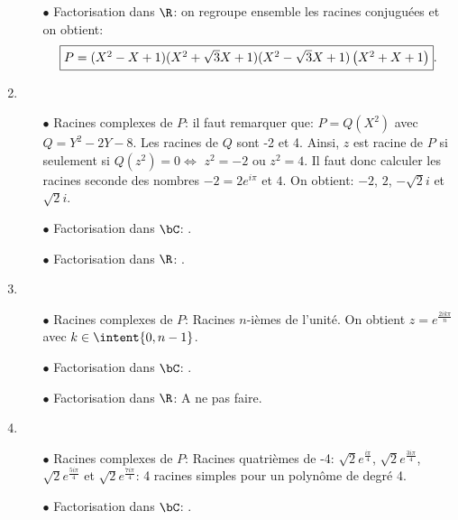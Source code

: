 \documentclass[a4paper, 11pt,reqno]{article}
\begin{document}
\begin{correction}
\begin{enumerate}
\begin{itemize}
			      \item[$\bullet$] Factorisation dans $\R$: on regroupe ensemble les racines conjugu\'ees et on obtient:
			            $$\fbox{$P=(X^2-X+1)(X^2+\sqrt{3}X+1)(X^2-\sqrt{3}X+1)\left(X^2+X+1\right)$}.$$
		      \end{itemize}
		\item
		      \begin{itemize}
			      \item[$\bullet$] Racines complexes de $P$:  il faut remarquer que: $P=Q(X^2)$ avec $Q=Y^2-2Y-8$. Les racines de $Q$ sont -2 et 4. Ainsi, $z$ est racine de $P$ si seulement si $Q(z^2)=0\Leftrightarrow$ $z^2=-2$ ou $z^2=4$. Il faut donc calculer les racines seconde des nombres $-2=2e^{i\pi}$ et $4$. On obtient: $-2$, $2$, $-\sqrt{2}i$ et $\sqrt{2}i$.
			      \item[$\bullet$] Factorisation dans $\bC$: .
			      \item[$\bullet$] Factorisation dans $\R$: .
		      \end{itemize}
		\item
		      \begin{itemize}
			      \item[$\bullet$] Racines complexes de $P$: Racines $n$-i\`{e}mes de l'unit\'e. On obtient $z=e^{\frac{2ik\pi}{n}}$ avec $k\in\intent{ 0,n-1}$.
			      \item[$\bullet$] Factorisation dans $\bC$: .
			      \item[$\bullet$] Factorisation dans $\R$: A ne pas faire.
		      \end{itemize}
		\item
		      \begin{itemize}
			      \item[$\bullet$] Racines complexes de $P$: Racines quatri\`{e}mes de -4: $\sqrt{2}e^{\frac{i\pi}{4}}$, $\sqrt{2}e^{\frac{3i\pi}{4}}$, $\sqrt{2}e^{\frac{5i\pi}{4}}$ et $\sqrt{2}e^{\frac{7i\pi}{4}}$: 4 racines simples pour un polyn\^{o}me de degr\'e 4.
			      \item[$\bullet$] Factorisation dans $\bC$: .

\end{itemize}
\end{enumerate}
\end{correction}
\end{document}
